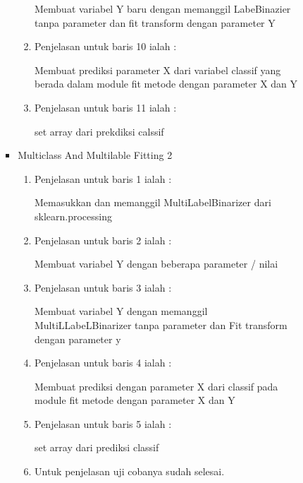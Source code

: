 \begin{itemize}
\begin{itemize}
\begin{itemize}
\begin{itemize}
\begin{enumerate}
\par Membuat variabel Y baru dengan memanggil LabeBinazier tanpa parameter dan fit transform dengan parameter Y
\par
\item Penjelasan untuk baris 10 ialah :
\par Membuat prediksi parameter X dari variabel classif yang berada dalam module fit metode dengan parameter X dan Y
\par
\item Penjelasan untuk baris 11 ialah :
\par set array dari prekdiksi calssif
\par
\end{enumerate}
\end{itemize}
\par
\par
\begin{itemize}
\item Multiclass And Multilable Fitting 2 
\par
\begin{enumerate}
\item Penjelasan untuk baris 1 ialah : 
\par Memasukkan dan memanggil MultiLabelBinarizer dari sklearn.processing
\par
\par
\item Penjelasan untuk baris 2 ialah :
\par Membuat variabel Y dengan beberapa parameter / nilai
\par
\item Penjelasan untuk baris 3  ialah :
\par Membuat variabel Y dengan memanggil MultiLLabeLBinarizer tanpa parameter dan Fit transform dengan parameter y
\par
\item Penjelasan untuk baris 4  ialah :
\par Membuat prediksi dengan parameter X dari classif pada module fit metode dengan parameter X dan Y
\par
\item Penjelasan untuk baris 5  ialah :
\par set array dari prediksi classif
\par
\item Untuk penjelasan uji cobanya sudah selesai.
\par
\end{enumerate}
\end{itemize}
\end{itemize}
\end{itemize}





\end{itemize}
